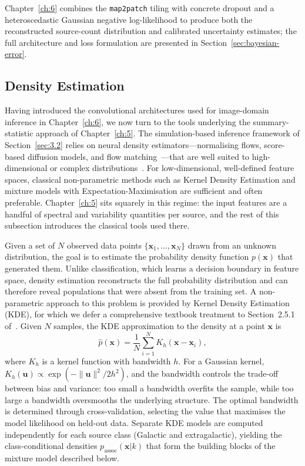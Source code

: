Chapter~\ref{ch:6} combines the \texttt{map2patch} tiling with concrete dropout and a heteroscedastic Gaussian negative log-likelihood to produce both the reconstructed source-count distribution and calibrated uncertainty estimates; the full architecture and loss formulation are presented in Section~\ref{sec:bayesian-error}.

\subsection{Density Estimation}
\label{sec:3.3.4}

Having introduced the convolutional architectures used for image-domain inference in Chapter~\ref{ch:6}, we now turn to the tools underlying the summary-statistic approach of Chapter~\ref{ch:5}.
The simulation-based inference framework of Section~\ref{sec:3.2} relies on neural density estimators---normalising flows, score-based diffusion models, and flow matching~\cite{Papamakarios:2021,Song:2021zrs,Lipman:2023hef}---that are well suited to high-dimensional or complex distributions~\cite{Cranmer:2020}.
For low-dimensional, well-defined feature spaces, classical non-parametric methods such as Kernel Density Estimation and mixture models with Expectation-Maximisation are sufficient and often preferable.
Chapter~\ref{ch:5} sits squarely in this regime: the input features are a handful of spectral and variability quantities per source, and the rest of this subsection introduces the classical tools used there.

Given a set of $N$ observed data points $\{\mathbf{x}_1, \ldots, \mathbf{x}_N\}$ drawn from an unknown distribution, the goal is to estimate the probability density function $p(\mathbf{x})$ that generated them.
Unlike classification, which learns a decision boundary in feature space, density estimation reconstructs the full probability distribution and can therefore reveal populations that were absent from the training set.
A non-parametric approach to this problem is provided by Kernel Density Estimation (KDE), for which we defer a comprehensive textbook treatment to Section~2.5.1 of~\cite{bishop}.
Given $N$ samples, the KDE approximation to the density at a point $\mathbf{x}$ is
\begin{equation}
	\hat{p}(\mathbf{x}) = \frac{1}{N} \sum_{i=1}^{N} K_h(\mathbf{x} - \mathbf{x}_i),
	\label{eq:kde}
\end{equation}
where $K_h$ is a kernel function with bandwidth $h$.
For a Gaussian kernel, $K_h(\mathbf{u}) \propto \exp(-\|\mathbf{u}\|^2 / 2h^2)$, and the bandwidth controls the trade-off between bias and variance: too small a bandwidth overfits the sample, while too large a bandwidth oversmooths the underlying structure.
The optimal bandwidth is determined through cross-validation, selecting the value that maximises the model likelihood on held-out data.
Separate KDE models are computed independently for each source class (Galactic and extragalactic), yielding the class-conditional densities $p_\mathrm{assoc}(\mathbf{x}|k)$ that form the building blocks of the mixture model described below.

